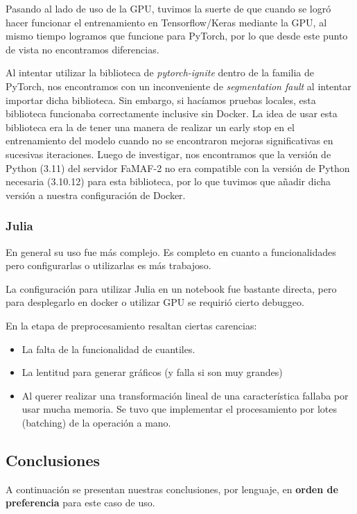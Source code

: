 \documentclass[11pt]{article}
\let\Oldsubsection\subsection
\renewcommand{\subsection}{\FloatBarrier\Oldsubsection}
\let\Oldsubsubsection\subsubsection
\renewcommand{\subsubsection}{\FloatBarrier\Oldsubsubsection}
\begin{document}
Pasando al lado de uso de la GPU, tuvimos la suerte de que cuando se logró hacer funcionar el entrenamiento en Tensorflow/Keras mediante la GPU, al mismo tiempo logramos que funcione para PyTorch, por lo que desde este punto de vista no encontramos diferencias.

Al intentar utilizar la biblioteca de \textit{pytorch-ignite} dentro de la familia de PyTorch, nos encontramos con un inconveniente de \textit{segmentation fault} al intentar importar dicha biblioteca. Sin embargo, si hacíamos pruebas locales, esta biblioteca funcionaba correctamente inclusive sin Docker. La idea de usar esta biblioteca era la de tener una manera de realizar un early stop en el entrenamiento del modelo cuando no se encontraron mejoras significativas en sucesivas iteraciones. Luego de investigar, nos encontramos que la versión de Python (3.11) del servidor FaMAF-2 no era compatible con la versión de Python necesaria (3.10.12) para esta biblioteca, por lo que tuvimos que añadir dicha versión a nuestra configuración de Docker.

\subsubsection{Julia}

En general su uso fue más complejo. Es completo en cuanto a funcionalidades pero configurarlas o utilizarlas es más trabajoso.

La configuración para utilizar Julia en un notebook fue bastante directa, pero para desplegarlo en docker o utilizar GPU se requirió cierto debuggeo.

En la etapa de preprocesamiento resaltan ciertas carencias:

\begin{itemize}
    \item La falta de la funcionalidad de cuantiles.
    \item La lentitud para generar gráficos (y falla si son muy grandes)
    \item Al querer realizar una transformación lineal de una característica fallaba por usar mucha memoria. Se tuvo que implementar el procesamiento por lotes (batching) de la operación a mano.
\end{itemize}

\subsection{Conclusiones}

A continuación se presentan nuestras conclusiones, por lenguaje, en \textbf{orden de preferencia} para este caso de uso.
\end{document}
